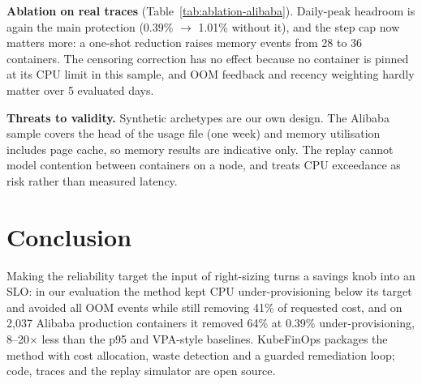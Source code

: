 \documentclass[conference]{IEEEtran}
\begin{document}
\begin{table}[t]
\centering
\caption{Alibaba v2018: ablation and $\varepsilon$ sweep.}
\label{tab:ablation-alibaba}
\resizebox{\columnwidth}{!}{}
\end{table}

\textbf{Ablation on real traces} (Table~\ref{tab:ablation-alibaba}). Daily-peak headroom is again the main
protection (0.39\% $\rightarrow$ 1.01\% without it), and the step cap now matters more: a one-shot reduction
raises memory events from 28 to 36 containers. The censoring correction has no effect because no container is
pinned at its CPU limit in this sample, and OOM feedback and recency weighting hardly matter over 5 evaluated
days.

\textbf{Threats to validity.} Synthetic archetypes are our own design. The Alibaba sample covers the head of
the usage file (one week) and memory utilisation includes page cache, so memory results are indicative only.
The replay cannot model contention between containers on a node, and treats CPU exceedance as risk rather
than measured latency.

\section{Conclusion}
Making the reliability target the input of right-sizing turns a savings knob into an SLO: in our evaluation the
method kept CPU under-provisioning below its target and avoided all OOM events while still removing 41\% of
requested cost, and on 2,037 Alibaba production containers it removed 64\% at 0.39\% under-provisioning, 8--20$\times$
less than the p95 and VPA-style baselines. KubeFinOps packages the method with cost allocation, waste detection and a guarded remediation
loop; code, traces and the replay simulator are open source.



\end{document}

